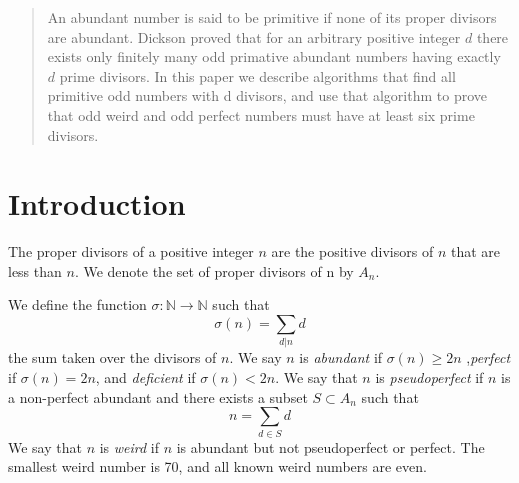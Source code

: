 \documentclass[../paper.tex]{article}
\begin{document}
\begin{abstract}
An abundant number is said to be primitive if none of its proper 
divisors are abundant.  Dickson proved that for an arbitrary
positive integer $d$ there exists only finitely many odd primative
abundant numbers having exactly $d$ prime divisors.
In this paper we describe algorithms
that find all primitive odd numbers with d divisors, and use that
algorithm to prove that odd weird and odd perfect numbers must
have at least six prime divisors.

\end{abstract}

\section{Introduction}
The proper divisors of a positive integer $n$ are the positive
divisors of $n$ that are less than $n$. We denote the set of 
proper divisors of n by $\textit{A}_{n}$.

We define the function 
%
$\sigma: \mathbb{N} \rightarrow \mathbb{N}$
%
such that
%
$$\sigma(n) = \sum_{d|n}d$$
%
the sum taken over the divisors of $n$. We say $n$ is 
\textit{abundant} if $\sigma(n) \geq 2n$ \footnotemark
,\textit{perfect} if $\sigma(n) = 2n$, and \textit{deficient} if 
$\sigma(n) < 2n$. We say that $n$ is \textit{pseudoperfect} if 
$n$ is a non-perfect abundant and there exists a subset $ S 
\subset \textit{A}_{n}$ such that
%
$$ n = \sum_{d \in S} d$$
%
We say that $n$ is \textit{weird} if $n$ is abundant but not 
pseudoperfect or perfect. The smallest weird number is 70, and 
all known weird numbers are even.
\end{document}
